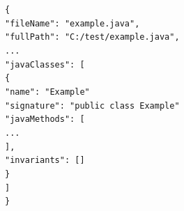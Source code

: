 			\noindent
			\- \- \- \texttt{\{}\\	
			\- \- \- \- \- \- \texttt{"fileName": "example.java", }\\
			\- \- \- \- \- \- \texttt{"fullPath": "C:/test/example.java", }\\ 
			\- \- \- \- \- \- \texttt{...}\\
			\- \- \- \- \- \- \texttt{"javaClasses": [}\\
			\- \- \- \- \- \- \- \- \- \texttt{\{}\\
			\- \- \- \- \- \- \- \- \- \- \- \- \texttt{"name": "Example"}\\
			\- \- \- \- \- \- \- \- \- \- \- \- \texttt{"signature": "public class Example"}\\
			\- \- \- \- \- \- \- \- \- \- \- \- \texttt{"javaMethods": [}\\
			\- \- \- \- \- \- \- \- \- \- \- \- \- \- \- \texttt{...}\\ 
			\- \- \- \- \- \- \- \- \- \- \- \- \texttt{],}\\
			\- \- \- \- \- \- \- \- \- \- \- \- \texttt{"invariants": []}\\
      		\- \- \- \- \- \- \- \- \- \texttt{\}}\\
      		\- \- \- \- \- \- \texttt{]}\\
      		\- \- \- \texttt{\}}\\			